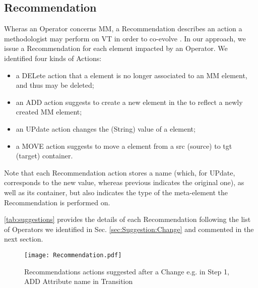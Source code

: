 \subsection{Recommendation}
\label{sec:Suggestion:Recommendation}

Wheras an \textsf{Operator} concerns \textsf{MM}, a \textsf{Recommendation} 
describes an action a methodologist may perform on \textsf{VT} in order to
co-evolve \viewtypes. 
In our approach, we issue a \textsf{Recommendation} for each \viewtype element 
\textsf{impacted} by an \textsf{Operator}. We identified four kinds of \textsf{Action}s: 
\begin{itemize}
	\item a \textsf{DEL}ete action that a \viewtype element is no longer associated
	to an \textsf{MM} element, and thus may be deleted;
	\item an \textsf{ADD} action suggests to create a new element in the \viewtype
	to reflect a newly created \textsf{MM} element;
	\item an \textsf{UP}date action changes the (String) value of a \viewtype element;
	\item a \textsf{MOVE} action suggests to move a \viewtype element from a \textsf{src}
	(source) to \textsf{tgt} (target) container.
\end{itemize}
Note that each \textsf{Recommendation} action stores a \textsf{name} (which, for
\textsf{UP}date, corresponds to the new value, whereas \textsf{previous} 
indicates the original one), as well as its \textsf{container}, but also 
indicates the \textsf{type} of the \viewtype meta-element the 
\textsf{Recommendation} is performed on.

\autoref{tab:suggestions} provides the details of each \textsf{Recommendation} 
following the list of \textsf{Operator}s we identified in Sec. 
\ref{sec:Suggestion:Change} and commented in the next section.

\begin{figure}[t]
    \centering
    \texttt{[image: Recommendation.pdf]}
    \caption{\textsf{Recommendation}s actions suggested after a \textsf{Change}
    e.g. in Step 1, \textsf{ADD} Attribute \textsf{name} in \textsf{Transition} 
		}
    \label{fig:Recommendation}
\end{figure}